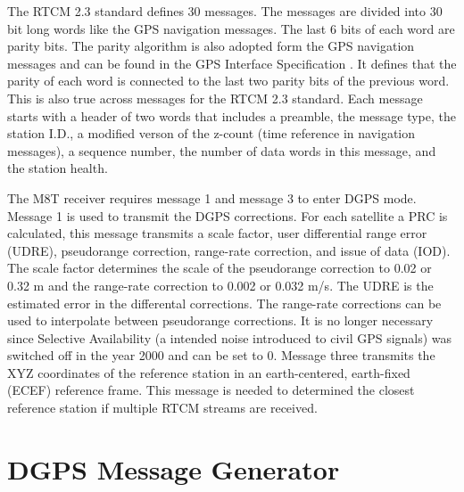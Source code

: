 The RTCM 2.3 standard defines 30 messages.
The messages are divided into 30 bit long words like the GPS navigation messages.
The last 6 bits of each word are parity bits.
The parity algorithm is also adopted form the GPS navigation messages and can be found in the GPS Interface Specification \cite{IS-GPS-200}.
It defines that the parity of each word is connected to the last two parity bits of the previous word.
This is also true across messages for the RTCM 2.3 standard.
Each message starts with a header of two words that includes a preamble, the message type, the station I.D., a modified verson of the z-count (time reference in navigation messages), a sequence number, the number of data words in this message, and the station health.

The M8T receiver requires message 1 and message 3 to enter DGPS mode.
Message 1 is used to transmit the DGPS corrections.
For each satellite a PRC is calculated, this message transmits a scale factor, user differential range error (UDRE), pseudorange correction, range-rate correction, and issue of data (IOD).
The scale factor determines the scale of the pseudorange correction to 0.02 or 0.32 m and the range-rate correction to 0.002 or 0.032 m/s.
The UDRE is the estimated error in the differental corrections.
The range-rate corrections can be used to interpolate between pseudorange corrections.
It is no longer necessary since Selective Availability (a intended noise introduced to civil GPS signals) was switched off in the year 2000 and can be set to 0.
Message three transmits the XYZ coordinates of the reference station in an earth-centered, earth-fixed (ECEF) reference frame.
This message is needed to determined the closest reference station if multiple RTCM streams are received.

\section{DGPS Message Generator}\label{sec:dgps_message_generator}
